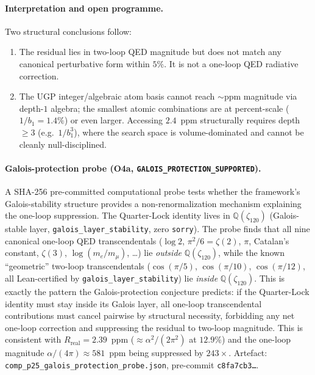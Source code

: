 \documentclass[11pt]{article}
\theoremstyle{remark}
\newcommand{\bone}{b_1}
\newcommand{\zetaN}[1]{\zeta_{#1}}
\begin{document}
\paragraph{Interpretation and open programme.}
Two structural conclusions follow:
\begin{enumerate}[leftmargin=2em,itemsep=0.1em]
  \item The residual lies in two-loop QED magnitude but does not match any
    canonical perturbative form within $5\%$.  It is not a one-loop
    QED radiative correction.
  \item The UGP integer/algebraic atom basis cannot reach $\sim$ppm magnitude
    via depth-$1$ algebra; the smallest atomic combinations are at
    percent-scale ($1/\bone = 1.4\%$) or even larger.
    Accessing $2.4$~ppm structurally requires depth $\geq 3$
    (e.g.\ $1/\bone^3$), where the search space is volume-dominated and
    cannot be cleanly null-disciplined.
\end{enumerate}
\paragraph{Galois-protection probe (O4a, \texttt{GALOIS\_PROTECTION\_SUPPORTED}).}
A SHA-256 pre-committed computational probe tests whether the framework's
Galois-stability structure provides a non-renormalization mechanism explaining
the one-loop suppression.
The Quarter-Lock identity lives in $\mathbb{Q}(\zetaN{120})$ (Galois-stable layer,
\texttt{galois\_layer\_stability}, zero \texttt{sorry}).
The probe finds that all nine canonical one-loop QED transcendentals
($\log 2$, $\pi^2/6 = \zeta(2)$, $\pi$, Catalan's constant, $\zeta(3)$,
$\log(m_e/m_\mu)$, \ldots) lie \emph{outside} $\mathbb{Q}(\zetaN{120})$, while the
known ``geometric'' two-loop transcendentals ($\cos(\pi/5)$, $\cos(\pi/10)$,
$\cos(\pi/12)$, all Lean-certified by \texttt{galois\_layer\_stability}) lie
\emph{inside} $\mathbb{Q}(\zetaN{120})$.
This is exactly the pattern the Galois-protection conjecture predicts:
if the Quarter-Lock identity must stay inside its Galois layer, all one-loop
transcendental contributions must cancel pairwise by structural necessity,
forbidding any net one-loop correction and suppressing the residual to
two-loop magnitude.
This is consistent with $R_{\mathrm{real}} = 2.39$~ppm ($\approx \alpha^2/(2\pi^2)$
at $12.9\%$) and the one-loop magnitude $\alpha/(4\pi) \approx 581$~ppm being
suppressed by $243\times$.
Artefact: \texttt{comp\_p25\_galois\_protection\_probe.json},
pre-commit \texttt{c8fa7cb3\ldots}.
\end{document}
